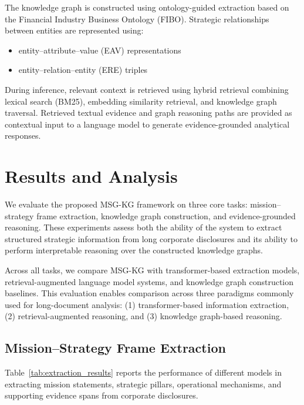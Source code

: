 \documentclass[11pt]{article}
\begin{document}
The knowledge graph is constructed using ontology-guided extraction based on the Financial Industry Business Ontology (FIBO). Strategic relationships between entities are represented using:

\begin{itemize}[leftmargin=1.0em, itemsep=0.05em, topsep=0.05em]
\item entity--attribute--value (EAV) representations
\item entity--relation--entity (ERE) triples
\end{itemize}

During inference, relevant context is retrieved using hybrid retrieval combining lexical search (BM25), embedding similarity retrieval, and knowledge graph traversal. Retrieved textual evidence and graph reasoning paths are provided as contextual input to a language model to generate evidence-grounded analytical responses.
\section{Results and Analysis}

We evaluate the proposed MSG-KG framework on three core tasks: mission--strategy frame extraction, knowledge graph construction, and evidence-grounded reasoning. These experiments assess both the ability of the system to extract structured strategic information from long corporate disclosures and its ability to perform interpretable reasoning over the constructed knowledge graphs.

Across all tasks, we compare MSG-KG with transformer-based extraction models, retrieval-augmented language model systems, and knowledge graph construction baselines. This evaluation enables comparison across three paradigms commonly used for long-document analysis: (1) transformer-based information extraction, (2) retrieval-augmented reasoning, and (3) knowledge graph-based reasoning.

\subsection{Mission--Strategy Frame Extraction}

Table~\ref{tab:extraction_results} reports the performance of different models in extracting mission statements, strategic pillars, operational mechanisms, and supporting evidence spans from corporate disclosures.
\end{document}
